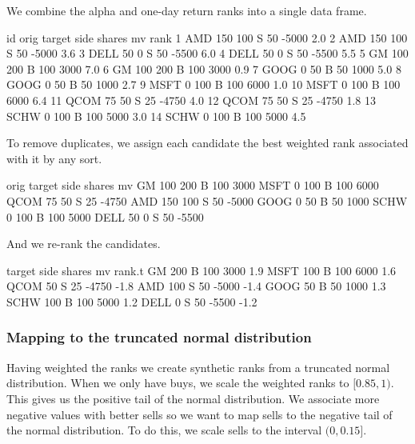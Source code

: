 \documentclass{article}
\begin{document}
We combine the alpha and one-day return ranks into a single data
frame.


\begin{Schunk}
\begin{Soutput}
     id orig target side shares    mv rank
1   AMD  150    100    S     50 -5000  2.0
2   AMD  150    100    S     50 -5000  3.6
3  DELL   50      0    S     50 -5500  6.0
4  DELL   50      0    S     50 -5500  5.5
5    GM  100    200    B    100  3000  7.0
6    GM  100    200    B    100  3000  0.9
7  GOOG    0     50    B     50  1000  5.0
8  GOOG    0     50    B     50  1000  2.7
9  MSFT    0    100    B    100  6000  1.0
10 MSFT    0    100    B    100  6000  6.4
11 QCOM   75     50    S     25 -4750  4.0
12 QCOM   75     50    S     25 -4750  1.8
13 SCHW    0    100    B    100  5000  3.0
14 SCHW    0    100    B    100  5000  4.5
\end{Soutput}
\end{Schunk}

To remove duplicates, we assign each candidate the best weighted rank
associated with it by any sort.  


\begin{Schunk}
\begin{Soutput}
     orig target side shares    mv
GM    100    200    B    100  3000
MSFT    0    100    B    100  6000
QCOM   75     50    S     25 -4750
AMD   150    100    S     50 -5000
GOOG    0     50    B     50  1000
SCHW    0    100    B    100  5000
DELL   50      0    S     50 -5500
\end{Soutput}
\end{Schunk}

And we re-rank the candidates.

\begin{Schunk}
\begin{Soutput}
     target side shares    mv rank.t
GM      200    B    100  3000    1.9
MSFT    100    B    100  6000    1.6
QCOM     50    S     25 -4750   -1.8
AMD     100    S     50 -5000   -1.4
GOOG     50    B     50  1000    1.3
SCHW    100    B    100  5000    1.2
DELL      0    S     50 -5500   -1.2
\end{Soutput}
\end{Schunk}

\subsubsection{Mapping to the truncated normal distribution}

Having weighted the ranks we create synthetic ranks from a truncated
normal distribution.  When we only have buys, we scale the weighted
ranks to $[0.85,1)$.  This gives us the positive tail of the normal
distribution.  We associate more negative values with better sells so
we want to map sells to the negative tail of the normal distribution.
To do this, we scale sells to the interval $(0,0.15]$.
\end{document}
